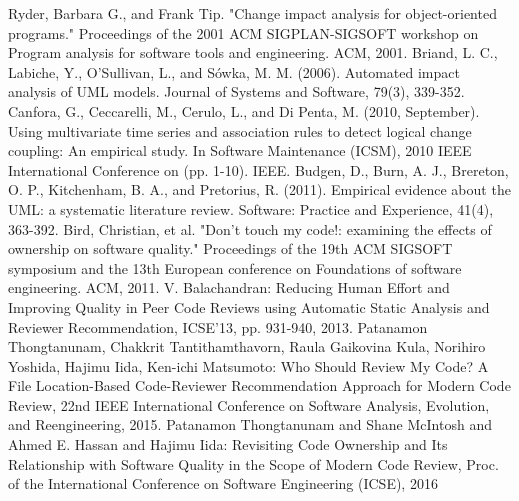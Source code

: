 \documentclass{fose2016}           %
\begin{document}
\begin{thebibliography}{10}
Ryder, Barbara G., and Frank Tip. "Change impact analysis for object-oriented programs." Proceedings of the 2001 ACM SIGPLAN-SIGSOFT workshop on Program analysis for software tools and engineering. ACM, 2001.
Briand, L. C., Labiche, Y., O’Sullivan, L., and Sówka, M. M. (2006). Automated impact analysis of UML models. Journal of Systems and Software, 79(3), 339-352.
 Canfora, G., Ceccarelli, M., Cerulo, L., and Di Penta, M. (2010, September). Using multivariate time series and association rules to detect logical change coupling: An empirical study. In Software Maintenance (ICSM), 2010 IEEE International Conference on (pp. 1-10). IEEE.
Budgen, D., Burn, A. J., Brereton, O. P., Kitchenham, B. A., and Pretorius, R. (2011). Empirical evidence about the UML: a systematic literature review. Software: Practice and Experience, 41(4), 363-392.
Bird, Christian, et al. "Don't touch my code!: examining the effects of ownership on software quality." Proceedings of the 19th ACM SIGSOFT symposium and the 13th European conference on Foundations of software engineering. ACM, 2011.
V. Balachandran: Reducing Human Effort and Improving Quality in Peer Code Reviews using Automatic Static Analysis and Reviewer Recommendation, ICSE'13, pp. 931-940, 2013.
Patanamon Thongtanunam, Chakkrit Tantithamthavorn, Raula Gaikovina Kula, Norihiro Yoshida, Hajimu Iida, Ken-ichi Matsumoto: Who Should Review My Code? A File Location-Based Code-Reviewer Recommendation Approach for Modern Code Review, 22nd IEEE International Conference on Software Analysis, Evolution, and Reengineering, 2015.
Patanamon Thongtanunam and Shane McIntosh and Ahmed E. Hassan and Hajimu Iida: Revisiting Code Ownership and Its Relationship with Software Quality in the Scope of Modern Code Review, Proc. of the International Conference on Software Engineering (ICSE), 2016
\end{thebibliography}
\end{document}
